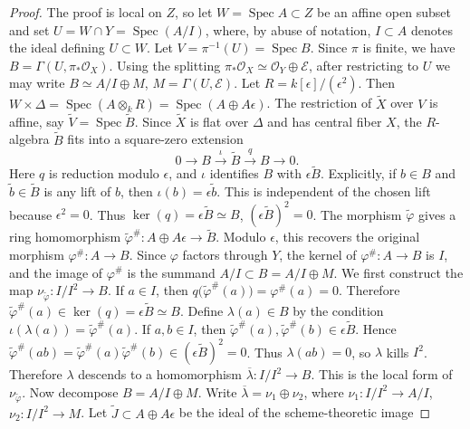 \documentclass[11pt,twoside]{amsart}
\theoremstyle{plain}
\numberwithin{equation}{section}
\theoremstyle{definition}
\begin{document}
\begin{proof}
The proof is local on \(Z\), so let \(W=\operatorname{Spec}A\subset Z\) be an affine open subset and set \(U=W\cap Y=\operatorname{Spec}(A/I)\), where, by abuse of notation,
\(I\subset A\) denotes the ideal defining \(U\subset W\). Let
\(V=\pi^{-1}(U)=\operatorname{Spec}B\). Since \(\pi\) is finite, we have
\(B=\Gamma(U,\pi_*\mathcal O_X)\). Using the splitting
\(\pi_*\mathcal O_X\simeq \mathcal O_Y\oplus \mathcal E\), after restricting to
\(U\) we may write \(B\simeq A/I\oplus M\), \(M=\Gamma(U,\mathcal E)\). Let \(R=k[\epsilon]/(\epsilon^2)\). Then
\(W\times\Delta=\operatorname{Spec}(A\otimes_k R)=\operatorname{Spec}(A\oplus A\epsilon)\). The restriction of \(\widetilde X\) over \(V\) is affine, say
\(\widetilde V=\operatorname{Spec}\widetilde B\).
Since \(\widetilde X\) is flat over \(\Delta\) and has central fiber \(X\), the \(R\)-algebra \(\widetilde B\) fits into a square-zero extension
\[
    0\longrightarrow B
    \xrightarrow{\iota}
    \widetilde B
    \xrightarrow{q}
    B
    \longrightarrow 0.
\]
Here \(q\) is reduction modulo \(\epsilon\), and \(\iota\) identifies \(B\) with
\(\epsilon\widetilde B\). Explicitly, if \(b\in B\) and \(\widetilde b\in \widetilde B\) is any lift of \(b\),
then \(\iota(b)=\epsilon\widetilde b\).
This is independent of the chosen lift because \(\epsilon^2=0\). Thus
\(\ker(q)=\epsilon\widetilde B\simeq B\), \((\epsilon\widetilde B)^2=0\).
The morphism \(\widetilde\varphi\) gives a ring homomorphism
\(\widetilde\varphi^\#:A\oplus A\epsilon\to\widetilde B\).
Modulo \(\epsilon\), this recovers the original morphism \(\varphi^\#:A\to B\).
Since \(\varphi\) factors through \(Y\), the kernel of \(\varphi^\#:A\to B\) is \(I\), and the image
of \(\varphi^\#\) is the summand \(A/I\subset B=A/I\oplus M\).
We first construct the map \(\nu_{\widetilde\varphi}: I/I^2\to B\).
If \(a\in I\), then \(q\bigl(\widetilde\varphi^\#(a)\bigr)=\varphi^\#(a)=0\).
Therefore \(\widetilde\varphi^\#(a)\in \ker(q)=\epsilon\widetilde B\simeq B\).
Define \(\lambda(a)\in B\) by the condition \(\iota(\lambda(a))=\widetilde\varphi^\#(a)\). If \(a,b\in I\), then \(\widetilde\varphi^\#(a),\widetilde\varphi^\#(b)\in \epsilon\widetilde B\). Hence \(\widetilde\varphi^\#(ab)=\widetilde\varphi^\#(a)\widetilde\varphi^\#(b)\in(\epsilon\widetilde B)^2=0\).
Thus \(\lambda(ab)=0\), so \(\lambda\) kills \(I^2\). Therefore \(\lambda\) descends to a homomorphism
\(\overline{\lambda}: I/I^2\to B\). This is the local form of \(\nu_{\widetilde\varphi}\).
Now decompose \(B=A/I\oplus M\). Write \(\overline{\lambda}=\nu_1\oplus \nu_2\), where \(\nu_1:I/I^2\to A/I\), \(\nu_2:I/I^2\to M\). Let \(\widetilde J\subset A\oplus A\epsilon\) be the ideal of the scheme-theoretic image

\end{proof}
\end{document}

